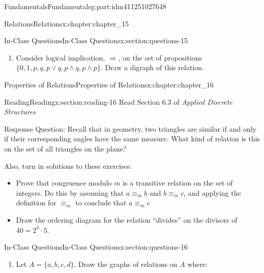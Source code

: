 \documentclass[oneside,10pt,]{book}
\numberwithin{equation}{section}
\begin{document}
\begin{partptx}{Fundamentals}{}{Fundamentals}{}{}{g:part:idm411251027648}
\begin{chapterptx}{Relations}{}{Relations}{}{}{x:chapter:chapter_15}
\begin{sectionptx}{In-Class Questions}{}{In-Class Questions}{}{}{x:section:questions-15}
\begin{enumerate}[label=\arabic*.]
\begin{enumerate}[label=(\alph*)]
\item{}Do the same for the relation \(p\) defined by \(x p y\) if \(x\) is a prefix of \(y\). For example, \(10 p 101\), but \(01 p 101\) is false.%
\end{enumerate}
%
\item{}Consider logical implication, \(\Rightarrow\), on the set of propositions \(\{0,1,p,q,p\lor q, p\land q, p\land p \}\). Draw a digraph of this relation.%
\end{enumerate}
%
\end{sectionptx}
\end{chapterptx}
%
\typeout{************************************************}
\typeout{************************************************}
%
\begin{chapterptx}{Properties of Relations}{}{Properties of Relations}{}{}{x:chapter:chapter_16}
\index{}%
%
%
\typeout{************************************************}
\typeout{************************************************}
%
\begin{sectionptx}{Reading}{}{Reading}{}{}{x:section:reading-16}
Read Section 6.3 of \emph{Applied Discrete Structures}%
\par
Response Question: Recall that in geometry, two triangles are similar if and only if their corresponding angles have the same measure. What kind of relation is this on the set of all triangles on the plane?%
\par
Also, turn in solutions to these exercises:%
\begin{itemize}[label=\textbullet]
\item{}Prove that congruence modulo \(m\) is a transitive relation on the set of integers. Do this by assuming that \(a \equiv_m b \) and \(b\equiv_m c\), and applying the definition for \(\equiv_m\) to conclude that \(a \equiv_m c\)%
\item{}Draw the ordering diagram for the relation ``divides'' on the divisors of \(40=2^3 \cdot 5\).%
\end{itemize}
%
\end{sectionptx}
%
%
\typeout{************************************************}
\typeout{************************************************}
%
\begin{sectionptx}{In-Class Questions}{}{In-Class Questions}{}{}{x:section:questions-16}
%
\begin{enumerate}[label=\arabic*.]
\item{}Let \(A = \{a, b, c, d\}\). Draw the graphs of relations on \(A\) where:%

\end{enumerate}
\end{sectionptx}
\end{chapterptx}
\end{partptx}
\end{document}
